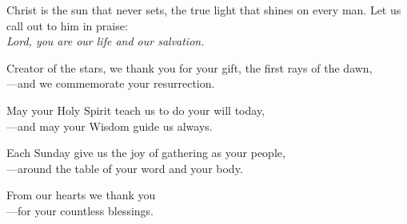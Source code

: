 \intercessions

\begin{raggedright}
Christ is the sun that never sets, the true light that shines on every man. Let us call out to him in praise:\\
\emph{Lord, you are our life and our salvation.}

\medskip Creator of the stars, we thank you for your gift, the first rays of the dawn,\\
{\color{red}---}and we commemorate your resurrection.

\medskip May your Holy Spirit teach us to do your will today,\\
{\color{red}---}and may your Wisdom guide us always.

\medskip Each Sunday give us the joy of gathering as your people,\\
{\color{red}---}around the table of your word and your body.

\medskip From our hearts we thank you\\
{\color{red}---}for your countless blessings.
\end{raggedright}
